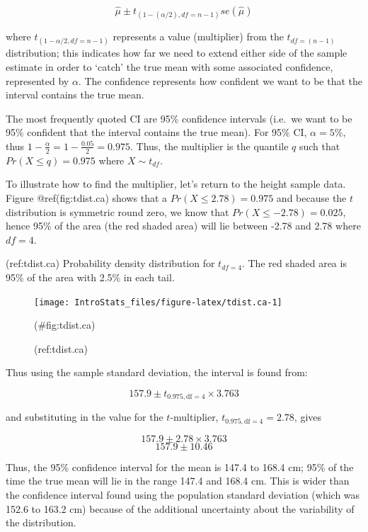 \documentclass[
  oneside]{krantz}
\begin{document}
\[\hat{\mu}\pm t_{(1-(\alpha/2), df=n-1)}se(\hat{\mu})\]

where \(t_{(1-\alpha/2, df=n-1)}\) represents a value (multiplier) from the \(t_{df=(n-1)}\) distribution; this indicates how far we need to extend either side of the sample estimate in order to `catch' the true mean with some associated confidence, represented by \(\alpha\). The confidence represents how confident we want to be that the interval contains the true mean.

The most frequently quoted CI are 95\% confidence intervals (i.e.~we want to be 95\% confident that the interval contains the true mean). For 95\% CI, \(\alpha = 5\)\%, thus \(1 - \frac{\alpha}{2} = 1 - \frac{0.05}{2} = 0.975\). Thus, the multiplier is the quantile \(q\) such that \(Pr(X \le q) = 0.975\) where \(X \sim t_{{df}}\).

To illustrate how to find the multiplier, let's return to the height sample data. Figure @ref(fig:tdist.ca) shows that a \(Pr(X \le 2.78) = 0.975\) and because the \(t\) distribution is symmetric round zero, we know that \(Pr(X \le -2.78) = 0.025\), hence 95\% of the area (the red shaded area) will lie between -2.78 and 2.78 where \(df=4\).

(ref:tdist.ca) Probability density distribution for \(t_{df=4}\). The red shaded area is 95\% of the area with 2.5\% in each tail.

\begin{figure}[!htb]

{\centering \texttt{[image: IntroStats\_files/figure-latex/tdist.ca-1]} 

}

\caption{(ref:tdist.ca)}(\#fig:tdist.ca)
\end{figure}

Thus using the sample standard deviation, the interval is found from:

\[157.9 \pm t_{0.975, \textrm{df}=4} \times 3.763\]

and substituting in the value for the \(t\)-multiplier, \(t_{0.975, \textrm{df}=4} = 2.78\), gives

\[157.9 \pm 2.78 \times 3.763\]
\[157.9 \pm 10.46\]

Thus, the 95\% confidence interval for the mean is 147.4 to 168.4 cm; 95\% of the time the true mean will lie in the range 147.4 and 168.4 cm. This is wider than the confidence interval found using the population standard deviation (which was 152.6 to 163.2 cm) because of the additional uncertainty about the variability of the distribution.
\end{document}
